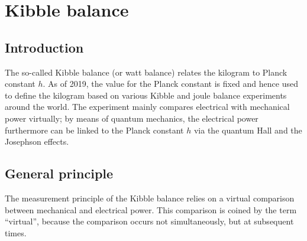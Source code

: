 \documentclass{report}
\numberwithin{tm}{section}
\begin{document}
%	
%	
%	

	\chapter{Kibble balance}
	\section{Introduction}
	The so-called Kibble balance (or watt balance) relates the kilogram to Planck constant $h$. As of 2019, the value for the Planck constant is fixed and hence used to define the kilogram based on various Kibble and joule balance experiments around the world. The experiment mainly compares electrical with mechanical power virtually; by means of quantum mechanics, the electrical power furthermore can be linked to the Planck constant $h$ via the quantum Hall and the Josephson effects.
	
	\section{General principle}\label{sec:deriv_Kibble_balance}
	The measurement principle of the Kibble balance relies on a virtual comparison between mechanical and electrical power. This comparison is coined by the term ``virtual'', because the comparison occurs not simultaneously, but at subsequent times.
	
\end{document}
